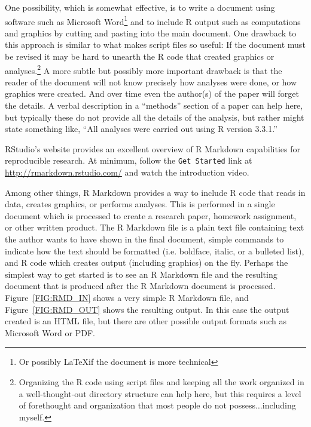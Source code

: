\documentclass[12pt,oneside]{book}\usepackage[]{graphicx}\usepackage[]{color}
\begin{document}
One possibility, which is somewhat effective, is to write a document using software such as Microsoft Word\footnote{Or possibly \LaTeX if the document is more technical} and to include R output such as computations and graphics by cutting and pasting into the main document. One drawback to this approach is similar to what makes script files so useful: If the document must be revised it may be hard to unearth the R code that created graphics or analyses.\footnote{Organizing the R code using script files and keeping all the work organized in a well-thought-out directory structure can help here, but this requires a level of forethought and organization that most people do not possess$\ldots$including myself.} A more subtle but possibly more important drawback is that the reader of the document will not know precisely how analyses were done, or how graphics were created. And over time even the author(s) of the paper will forget the details. A verbal description in a ``methods'' section of a paper can help here, but typically these do not provide all the details of the analysis, but rather might state something like, ``All analyses were carried out using R version 3.3.1.''

RStudio's website provides an excellent overview of R Markdown capabilities for reproducible research. At minimum, follow the \texttt{Get Started} link at \url{http://rmarkdown.rstudio.com/} and watch the introduction video.

Among other things, R Markdown provides a way to include R code that reads in data, creates graphics, or performs analyses. This is performed in a single document which is processed to create a research paper, homework assignment, or other written product. The R Markdown file is a plain text file containing text the author wants to have shown in the final document, simple commands to indicate how the text should be formatted (i.e. boldface, italic, or a bulleted list), and R code which creates output (including graphics) on the fly. Perhaps the simplest way to get started is to see an R Markdown file and the resulting document that is produced after the R Markdown document is processed. Figure~\ref{FIG:RMD_IN} shows a very simple R Markdown file, and Figure~\ref{FIG:RMD_OUT} shows the resulting output. In this case the output created is an HTML file, but there are other possible output formats such as Microsoft Word or PDF.
\end{document}
